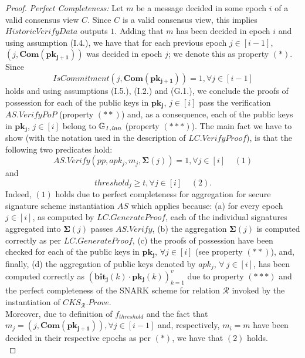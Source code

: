\begin{proof}
\noindent \textit{Perfect Completeness:} 
Let $m$ be a message decided in some epoch $i$ of a valid consensus view $C$. 
Since $C$ is a valid consensus view, this implies $\mathit{HistoricVerifyData}$ outputs $1$. Adding that $m$ has been decided in epoch $i$ 
and using assumption (I.4.), we have that for each previous epoch $j \in [i-1]$, $(j, \mathbf{Com}(\mathbf{pk_{j+1}}))$ 
was decided in epoch $j$; we denote this as property $(\ast)$. Since $$\mathit{IsCommitment}(j, \mathbf{Com}(\mathbf{pk_{j+1}})) = 1, \forall j \in [i-1]$$  
holds and using assumptions (I.5.), (I.2.) and (G.1.), we conclude the proofs of possession for each of the public keys in 
$\mathbf{pk_{j}}$, $j  \in [i]$ pass the verification $\mathit{AS.VerifyPoP}$ (property $(**)$) and, as a consequence, each of the public keys in $\mathbf{pk_{j}}$, $j  \in [i]$ belong to $\mathbb{G}_{\mathit{1,inn}}$ (property $(***)$). 
The main fact we have to show (with the notation used in the description of 
$\mathit{LC.VerifyProof}$), is that the following two predicates hold:
$$\mathit{AS.Verify}(\mathit{pp}, \mathit{apk_j}, m_j, \mathbf{\Sigma}(j)) = 1, \forall j \in [i]  \ \ \ \ \ (1)$$ 
and 
$$\mathit{threshold_j} \geq t, \forall j \in [i] \ \ \ \ \ (2).$$
\noindent Indeed, $(1)$ holds due to perfect completeness for aggregation for secure signature scheme instantiation 
$\mathit{AS}$ which applies because: (a) for every epoch $j \in [i]$, as computed by $\mathit{LC.GenerateProof}$, 
each of the individual signatures aggregated into $\mathbf{\Sigma}(j)$ passes $\mathit{AS.Verify}$, (b)
the aggregation $\mathbf{\Sigma}(j)$ is computed correctly as per $\mathit{LC.GenerateProof}$, (c) the proofs of possession have been checked 
for each of the public keys in $\mathbf{pk_{j}}$, $\forall j  \in [i]$ (see property $(**)$), and, finally, (d) the aggregation of public 
keys denoted by $\mathit{apk_j}$, $\forall \ j \in [i]$, has been computed correctly as $(\mathbf{bit_j}(k) \cdot \mathbf{pk_j}(k))_{k=1}^{v}$ 
due to property $(***)$ and the perfect completeness of the SNARK scheme for relation $\mathcal{R}$ invoked by the instantiation of 
$\mathit{CKS}_{\mathcal{R}}.\mathit{Prove}$. \\
Moreover, due to definition of $f_{\mathit{threshold}}$ and the fact that 
$m_j = (j, \mathbf{Com}(\mathbf{pk_{j+1}})), \forall j \in [i-1]$ and, respectively,  $m_i = m$ have been 
decided in their respective epochs as per $(*)$, we have that $(2)$ holds. \\


\end{proof}
